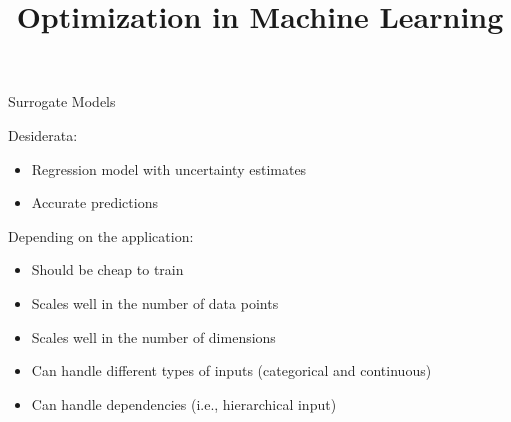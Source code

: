 \documentclass[11pt,compress,t,notes=noshow, xcolor=table]{beamer}
\title{Optimization in Machine Learning}
\date{}
\begin{document}

\begin{frame}{Surrogate Models}

Desiderata:

\begin{itemize}
  \item Regression model with uncertainty estimates
  \item Accurate predictions
\end{itemize}

\vspace{+0.45cm}

Depending on the application:

\begin{itemize}
  \item Should be cheap to train
  \item Scales well in the number of data points
  \item Scales well in the number of dimensions
  \item Can handle different types of inputs (categorical and continuous)
  \item Can handle dependencies (i.e., hierarchical input)
\end{itemize}

\end{frame}
\end{document}
